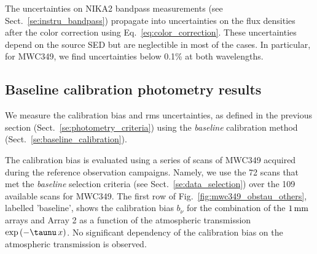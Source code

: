 {The uncertainties on NIKA2 bandpass measurements (see
Sect.~\ref{se:instru_bandpass}) propagate into
uncertainties on the flux densities after the color correction using
Eq.~\ref{eq:color_correction}. These
uncertainties depend on the source SED but are neglectible in most of
the cases. In particular, for MWC349, we find uncertainties below 0.1\% at
both wavelengths.}



\subsection{Baseline calibration photometry results}
\label{se:photometry_baseline}

We measure the calibration bias and rms uncertainties, as defined
in the previous section (Sect.~\ref{se:photometry_criteria}) using the
\emph{baseline} calibration method (Sect.~\ref{se:baseline_calibration}).

The calibration bias is evaluated using a
series of scans of MWC349 acquired during the
 reference observation campaigns. Namely, we use the 72 scans that met
 the \emph{baseline} selection
 criteria (see Sect.~\ref{se:data_selection}) over the 109 available
scans for MWC349. The first row of
Fig.~\ref{fig:mwc349_obstau_others}, labelled 'baseline', shows the
calibration bias $b_{\nu}$ for the combination of the $1\,\rm{mm}$ arrays and
Array 2 as a function of the atmospheric transmission %
$\exp \left( - \taunu \, x \right)$. No significant dependency of the
calibration bias on the atmospheric transmission is observed. 

